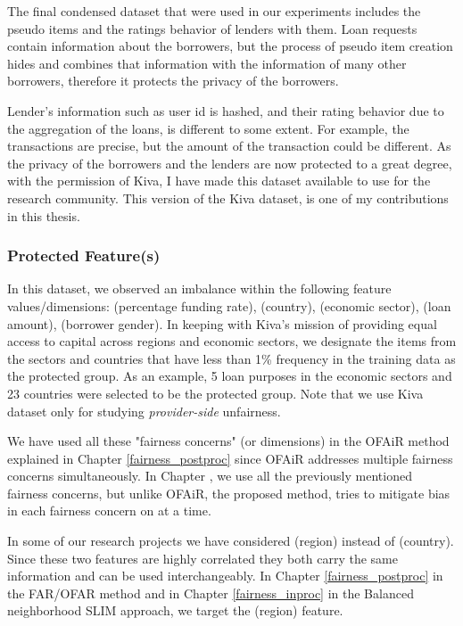     The final condensed dataset that were used in our experiments includes the pseudo items and the ratings behavior of lenders with them. Loan requests contain information about the borrowers, but the process of pseudo item creation hides and combines that information with the information of many other borrowers, therefore it protects the privacy of the borrowers. 
    
    Lender's information such as user id is hashed, and their rating behavior due to the aggregation of the loans, is different to some extent. For example, the transactions are precise, but the amount of the transaction could be different.
    As the privacy of the borrowers and the lenders are now protected to a great degree, with the permission of Kiva, I have made this dataset available to use for the research community. This version of the Kiva dataset, is one of my contributions in this thesis.


        \subsubsection{Protected Feature(s)}
        In this dataset, we observed an imbalance within the following feature values/dimensions: (percentage funding rate), (country), (economic sector), (loan amount), (borrower gender). In keeping with Kiva's mission of providing equal access to capital across regions and economic sectors, we designate the items from the sectors and countries that have less than 1\% frequency in the training data as the protected group. As an example, 5 loan purposes in the economic sectors and 23 countries were selected to be the protected group. Note that we use Kiva dataset only for studying \textit{provider-side} unfairness. %
        
        We have used all these "fairness concerns" (or dimensions) in the OFAiR method explained in Chapter \ref{fairness_postproc} since OFAiR addresses multiple fairness concerns simultaneously. In Chapter , we use all the previously mentioned fairness concerns, but unlike OFAiR, the proposed method, tries to mitigate bias in each fairness concern on at a time.
        
        In some of our research projects we have considered (region) instead of (country). Since these two features are highly correlated they both carry the same information and can be used interchangeably. In Chapter \ref{fairness_postproc} in the FAR/OFAR method and in Chapter \ref{fairness_inproc} in the Balanced neighborhood SLIM approach, we target the (region) feature.
        

